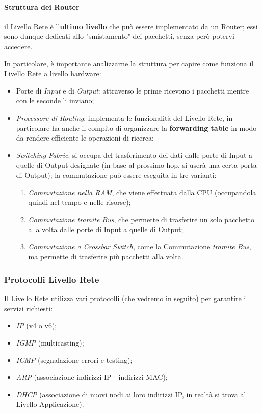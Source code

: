 \documentclass[a4paper]{article}
\begin{document}
			\paragraph{Struttura dei Router}
				il Livello Rete è l'\textbf{ultimo livello} che può essere implementato da un Router; essi sono dunque dedicati allo "smistamento" dei pacchetti, senza però potervi accedere.
				
				In particolare, è importante analizzarne la struttura per capire come funziona il Livello Rete a livello hardware:
				\begin{itemize}
					\item Porte di \emph{Input} e di \emph{Output}: attraverso le prime ricevono i pacchetti mentre con le seconde li inviano;
					\item \emph{Processore di Routing}: implementa le funzionalità del Livello Rete, in particolare ha anche il compito di organizzare la \textbf{forwarding table} in modo da rendere efficiente le operazioni di ricerca;
					\item \emph{Switching Fabric}: si occupa del trasferimento dei dati dalle porte di Input a quelle di Output designate (in base al prossimo hop, si userà una certa porta di Output); la commutazione può essere eseguita in tre varianti:
					\begin{enumerate}
						\item \emph{Commutazione nella RAM}, che viene effettuata dalla CPU (occupandola quindi nel tempo e nelle risorse);
						\item \emph{Commutazione tramite Bus}, che permette di trasferire un solo pacchetto alla volta dalle porte di Input a quelle di Output;
						\item \emph{Commutazione a Crossbar Switch}, come la Commutazione \emph{tramite Bus}, ma permette di trasferire più pacchetti alla volta.
					\end{enumerate}
				\end{itemize}
				
			\subsubsection{Protocolli Livello Rete}
			
				Il Livello Rete utilizza vari protocolli (che vedremo in seguito) per garantire i servizi richiesti:
				\begin{itemize}
					\item \emph{IP} (v4 o v6);
					\item \emph{IGMP} (multicasting);
					\item \emph{ICMP} (segnalazione errori e testing);
					\item \emph{ARP} (associazione indirizzi IP - indirizzi MAC);
					\item \emph{DHCP} (associazione di nuovi nodi ai loro indirizzi IP, in realtà si trova al Livello Applicazione).
				\end{itemize}
						
\end{document}
